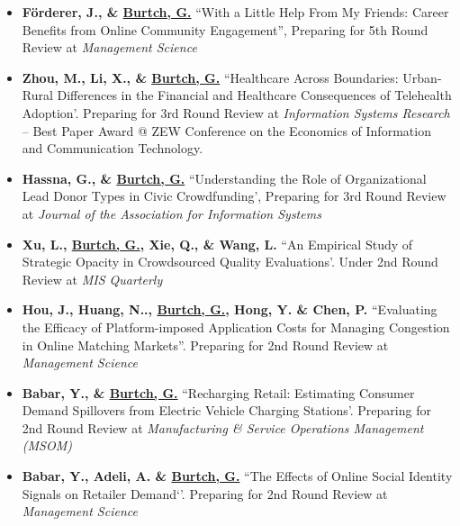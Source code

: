 \documentclass[10.5pt,letterpaper,sans]{moderncv}        %
\begin{document}
\begin{itemize}[leftmargin=!,labelindent=5pt,itemindent=-15pt]

\item \textbf{F{\"o}rderer, J., \& \underline{Burtch, G.}} ``With a Little Help From My Friends: Career Benefits from Online Community Engagement'', Preparing for 5th Round Review at \textit{Management Science}


\item \textbf{Zhou, M., Li, X., \& \underline{Burtch, G.}} ``Healthcare Across Boundaries: Urban-Rural Differences in the Financial and Healthcare Consequences of Telehealth Adoption'. Preparing for 3rd Round Review at \textit{Information Systems Research} \\-- Best Paper Award @ ZEW Conference on the Economics of Information and Communication Technology.

\item \textbf{Hassna, G., \& \underline{Burtch, G.}} ``Understanding the Role of Organizational Lead Donor Types in Civic Crowdfunding', Preparing for 3rd Round Review at \textit{Journal of the Association for Information Systems}

\item \textbf{Xu, L., \underline{Burtch, G.}, Xie, Q., \& Wang, L.} ``An Empirical Study of Strategic Opacity in Crowdsourced Quality Evaluations'. Under 2nd Round Review at \textit{MIS Quarterly}

\item \textbf{Hou, J., Huang, N.., \underline{Burtch, G.}, Hong, Y. \& Chen, P.} ``Evaluating the Efficacy of Platform-imposed Application Costs for Managing Congestion in Online Matching Markets''. Preparing for 2nd Round Review at \textit{Management Science} 

\item \textbf{Babar, Y., \& \underline{Burtch, G.}} ``Recharging Retail: Estimating Consumer Demand Spillovers from Electric Vehicle Charging Stations'. Preparing for 2nd Round Review at \textit{Manufacturing \& Service Operations Management (MSOM)} 

\item \textbf{Babar, Y., Adeli, A. \& \underline{Burtch, G.}} ``The Effects of Online Social Identity Signals on Retailer Demand`'. Preparing for 2nd Round Review at \textit{Management Science} 


\end{itemize}
\end{document}
